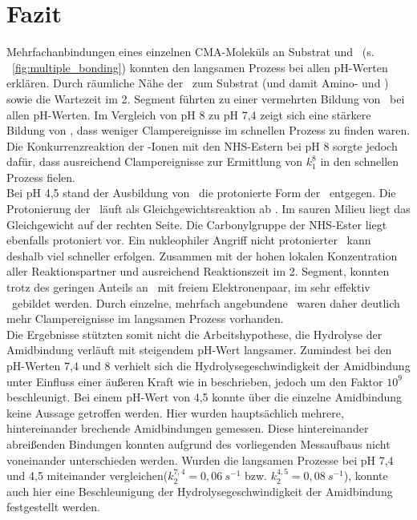 \chapter{Fazit}
\label{kap:Fazit}

Mehrfachanbindungen eines einzelnen \ac{CMA}-Moleküls an Substrat und \spitze~(s. \abb~\ref{fig:multiple_bonding}) konnten den langsamen Prozess bei allen pH-Werten erklären. Durch räumliche Nähe der \spitze~zum Substrat (und damit Amino- und \carboxys) sowie die Wartezeit im 2. Segment führten zu einer vermehrten Bildung von \amide~bei allen pH-Werten. Im Vergleich von pH 8 zu pH 7,4 zeigt sich eine stärkere Bildung von \amide, dass weniger Clampereignisse im schnellen Prozess zu finden waren. Die Konkurrenzreaktion der -Ionen mit den \ac{NHS}-Estern bei pH 8 sorgte jedoch dafür, dass ausreichend Clampereignisse zur Ermittlung von $k_1^8$ in den schnellen Prozess fielen.\\

Bei pH 4,5 stand der Ausbildung von \amide~die protonierte Form der \aminos~entgegen. Die Protonierung der \aminos~läuft als Gleichgewichtsreaktion ab \cite[189]{Latscha.2016}. Im sauren Milieu liegt das Gleichgewicht auf der rechten Seite. Die Carbonylgruppe der \ac{NHS}-Ester liegt ebenfalls protoniert vor. Ein nukleophiler Angriff nicht protonierter \aminos~kann deshalb viel schneller erfolgen. Zusammen mit der hohen lokalen Konzentration aller Reaktionspartner und ausreichend Reaktionszeit im 2. Segment, konnten trotz des geringen Anteils an \aminos~mit freiem Elektronenpaar, im sehr effektiv \amide~gebildet werden. Durch einzelne, mehrfach angebundene \spacer~waren daher deutlich mehr Clampereignisse im langsamen Prozess vorhanden.\\

Die Ergebnisse stützten somit nicht die Arbeitshypothese, die Hydrolyse der Amidbindung verläuft mit steigendem pH-Wert langsamer. Zumindest bei den pH-Werten 7,4 und 8 verhielt sich die Hydrolysegeschwindigkeit der Amidbindung unter Einfluss einer äußeren Kraft wie in \cite{Smith.1998,Bundgaard.1991,Song.2000} beschrieben, jedoch um den Faktor $10^9$ beschleunigt. Bei einem pH-Wert von 4,5 konnte über die einzelne Amidbindung keine Aussage getroffen werden. Hier wurden hauptsächlich mehrere, hintereinander brechende Amidbindungen gemessen. Diese hintereinander abreißenden Bindungen konnten aufgrund des vorliegenden Messaufbaus nicht voneinander unterschieden werden. Wurden die langsamen Prozesse bei pH 7,4 und 4,5 miteinander vergleichen($k_2^{7,4} = 0,06~s^{-1}$ bzw. $k_2^{4,5} = 0,08~s^{-1}$), konnte auch hier eine Beschleunigung der Hydrolysegeschwindigkeit der Amidbindung festgestellt werden.



